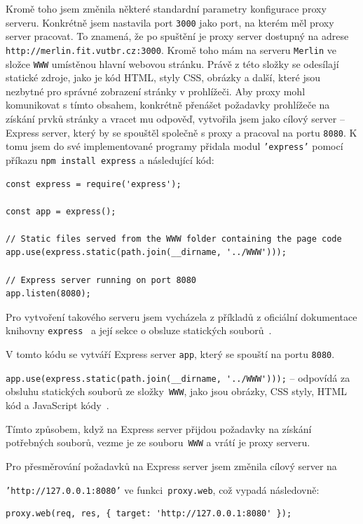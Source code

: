 Kromě toho jsem změnila některé standardní parametry konfigurace proxy serveru. Konkrétně jsem nastavila port \texttt{3000} jako port, na kterém měl proxy server pracovat. To znamená, že po spuštění je proxy server dostupný na adrese \texttt{http://merlin.fit.vutbr.cz:3000}. Kromě toho mám na serveru \texttt{Merlin} ve složce \texttt{WWW} umístěnou hlavní webovou stránku. Právě z této složky se odesílají statické zdroje, jako je kód HTML, styly CSS, obrázky a další, které jsou nezbytné pro správné zobrazení stránky v prohlížeči. Aby proxy mohl komunikovat s tímto obsahem, konkrétně přenášet požadavky prohlížeče na získání prvků stránky a vracet mu odpověď, vytvořila jsem jako cílový server -- Express server, který by se spouštěl společně s proxy a pracoval na portu \texttt{8080}. K tomu jsem do své implementované programy přidala modul \texttt{'express'} pomocí příkazu \texttt{npm install express} a následující kód:
\bigskip
\bigskip
\bigskip
\bigskip
\bigskip
\bigskip
\begin{lstlisting}[caption=Express server]
const express = require('express');

const app = express();

// Static files served from the WWW folder containing the page code
app.use(express.static(path.join(__dirname, '../WWW')));

// Express server running on port 8080
app.listen(8080);
\end{lstlisting}

Pro vytvoření takového serveru jsem vycházela z příkladů z oficiální dokumentace knihovny \texttt{express}~\cite{express} a její sekce o obsluze statických souborů~\cite{expressStatic}.

V tomto kódu se vytváří Express server \texttt{app}, který se spouští na portu \texttt{8080}. 

\verb|app.use(express.static(path.join(__dirname, '../WWW')));| -- odpovídá za obsluhu statických souborů ze složky~\texttt{WWW}, jako jsou obrázky, CSS styly, HTML kód a JavaScript kódy~\cite{expressStatic}.

Tímto způsobem, když na Express server přijdou požadavky na získání potřebných souborů, vezme je ze souboru~\texttt{WWW} a vrátí je proxy serveru. 

Pro přesměrování požadavků na Express server jsem změnila cílový server na

\noindent\texttt{'http://127.0.0.1:8080'} ve funkci~\texttt{proxy.web}, což vypadá následovně:

\begin{lstlisting}[caption=Function web]
proxy.web(req, res, { target: 'http://127.0.0.1:8080' });
\end{lstlisting}

